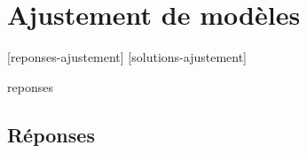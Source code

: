 \documentclass[letterpaper,11pt]{memoir}\usepackage[]{graphicx}\usepackage[]{color}
\newcounter{exercice}[chapter]
\newcommand{\prob}[1]{\mathrm{Pr} [ #1 ]}
\begin{document}
%


\chapter{Ajustement de modèles}
\label{chap:ajustement}

[reponses-ajustement]
[solutions-ajustement]

\begin{Filesave}{reponses}
\bigskip
\section*{Réponses}

\end{Filesave}
\end{document}
